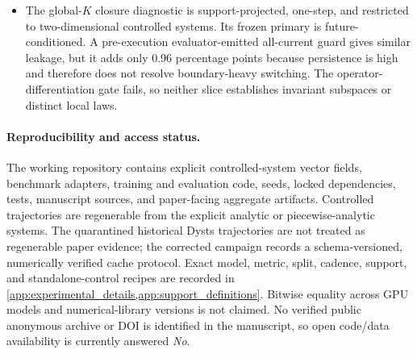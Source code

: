 \begin{itemize}
  one-family-per-fate result is on an evaluation-only single-well-dominated
  finite-time slice rather than proven basin interiors, and both support and
  fate are measured at \(T=20\), not from \(x_0\) or throughout a trajectory.
  Conditional on the recipe, its objective, representative fitting, and holdout
  assignment use no labels, but validation fate metrics selected T20 scoring,
  Jaccard 0.40, the temporal weight, and whole-packet advancement. Temporal sparse
  is worse than dense at long forecast horizons. A separate direct-rollout
  sparse model has lower through-horizon mean error, but its terminal-inclusive
  gate fails.  Neither experiment establishes empirical real-world
  generalization.
  \item The global-\(K\) closure diagnostic is support-projected, one-step, and
  restricted to two-dimensional controlled systems. Its frozen primary is
  future-conditioned. A pre-execution evaluator-emitted all-current guard gives
  similar leakage, but it adds only 0.96 percentage points because persistence
  is high and therefore does not resolve boundary-heavy switching. The
  operator-differentiation gate fails, so neither slice establishes invariant
  subspaces or distinct local laws.
\end{itemize}
\paragraph{Reproducibility and access status.}
The working repository contains explicit controlled-system vector fields,
benchmark adapters, training and evaluation code, seeds, locked dependencies,
tests, manuscript sources, and paper-facing aggregate artifacts.  Controlled
trajectories are regenerable from the explicit analytic or piecewise-analytic
systems. The quarantined historical Dysts trajectories are not treated as
regenerable paper evidence; the corrected campaign records a schema-versioned,
numerically verified cache protocol. Exact model,
metric, split, cadence, support, and standalone-control recipes are recorded in
\cref{app:experimental_details,app:support_definitions}.  Bitwise equality
across GPU models and numerical-library versions is not claimed.  No verified
public anonymous archive or DOI is identified in the manuscript, so open
code/data availability is currently answered \emph{No}.
